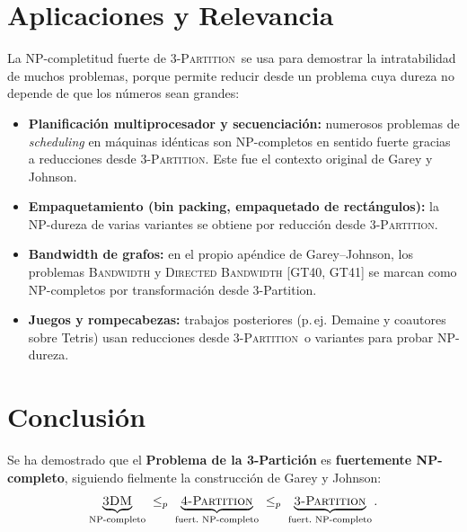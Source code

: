 \documentclass[12pt,a4paper]{article}
\theoremstyle{definition}
\theoremstyle{remark}
\newcommand{\TPART}{\textsc{3-Partition}}
\newcommand{\FPART}{\textsc{4-Partition}}
\newcommand{\DM}{\textsc{3DM}}
\begin{document}
\section{Aplicaciones y Relevancia}

La NP-completitud fuerte de \TPART\ se usa para demostrar la intratabilidad de
muchos problemas, porque permite reducir desde un problema cuya dureza no depende de
que los números sean grandes:

\begin{itemize}
  \item \textbf{Planificación multiprocesador y secuenciación:} numerosos problemas
        de \emph{scheduling} en máquinas idénticas son NP-completos en sentido fuerte
        gracias a reducciones desde \TPART. Este fue el contexto original de
        Garey y Johnson.

  \item \textbf{Empaquetamiento (bin packing, empaquetado de rectángulos):} la
        NP-dureza de varias variantes se obtiene por reducción desde \TPART.

  \item \textbf{Bandwidth de grafos:} en el propio apéndice de Garey--Johnson, los
        problemas \textsc{Bandwidth} y \textsc{Directed Bandwidth} [GT40, GT41] se
        marcan como NP-completos por transformación desde 3-Partition.

  \item \textbf{Juegos y rompecabezas:} trabajos posteriores
        (p.\,ej. Demaine y coautores sobre Tetris) usan reducciones desde \TPART\ o
        variantes para probar NP-dureza.
\end{itemize}

\section{Conclusión}

Se ha demostrado que el \textbf{Problema de la 3-Partición} es
\textbf{fuertemente NP-completo}, siguiendo fielmente la construcción de
Garey y Johnson:
\[
  \underbrace{\DM}_{\text{NP-completo}} \;\leq_p\;
  \underbrace{\FPART}_{\text{fuert.\ NP-completo}} \;\leq_p\;
  \underbrace{\TPART}_{\text{fuert.\ NP-completo}}.
\]
\end{document}
